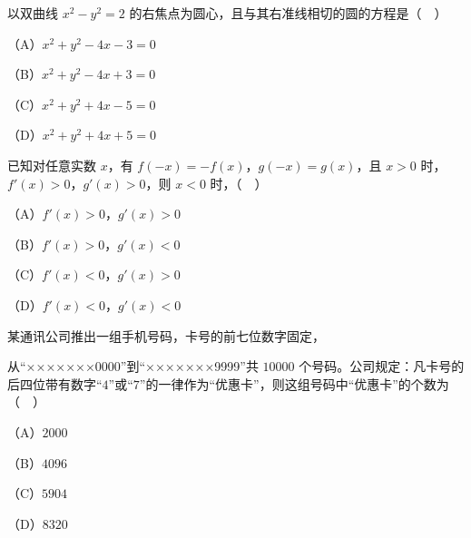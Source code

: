 \begin{question}
以双曲线 $x^2-y^2=2$ 的右焦点为圆心，且与其右准线相切的圆的方程是（　）

（A）$x^2+y^2-4x-3=0$

（B）$x^2+y^2-4x+3=0$

（C）$x^2+y^2+4x-5=0$

（D）$x^2+y^2+4x+5=0$

\end{question}
\begin{question}
已知对任意实数 $x$，有 $f(-x)=-f(x)$，$g(-x)=g(x)$，且 $x>0$ 时，$f'(x)>0$，$g'(x)>0$，则 $x<0$ 时，（　）

（A）$f'(x)>0$，$g'(x)>0$

（B）$f'(x)>0$，$g'(x)<0$

（C）$f'(x)<0$，$g'(x)>0$

（D）$f'(x)<0$，$g'(x)<0$

\end{question}
\begin{question}
某通讯公司推出一组手机号码，卡号的前七位数字固定，

从“×××××××0000”到“×××××××9999”共 $10000$ 个号码。公司规定：凡卡号的后四位带有数字“$4$”或“$7$”的一律作为“优惠卡”，则这组号码中“优惠卡”的个数为（　）

（A）$2000$

（B）$4096$

（C）$5904$

（D）$8320$

\end{question}

